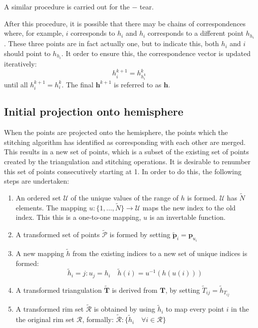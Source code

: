 \documentclass{article}
\renewcommand{\vec}[1]{\mathbf{#1}}
\begin{document}
A similar procedure is carried out for the $-$ tear.

After this procedure, it is possible that there may be chains of
correspondences where, for example, $i$ corresponds to $h_i$ and $h_i$
corresponds to a different point $h_{h_i}$. These three points are in
fact actually one, but to indicate this, both $h_i$ and $i$ should
point to $h_{h_i}$. It order to ensure this, the correspondence vector
is updated iteratively:
\begin{displaymath}
  h^{k+1}_i = h^k_{h^k_i}  
\end{displaymath}
until all $h^{k+1}_i = h^k_i$. The final $\vec{h}^{k+1}$ is referred
to as $\vec{h}$.



\subsection{Initial projection onto hemisphere}
\label{fold-sphere:sec:proj-onto-hemisph}

When the points are projected onto the hemisphere, the points which
the stitching algorithm has identified as corresponding with each
other are merged. This results in a new set of points, which is a
subset of the existing set of points created by the triangulation and
stitching operations. It is desirable to renumber this set of points
consecutively starting at 1. In order to do this, the following steps
are undertaken:
\begin{enumerate}
\item An ordered set $\mathcal{U}$ of the unique values of the range
  of $h$ is formed. $\mathcal{U}$ has $\tilde N$ elements. The mapping
  $u: \{1,\dots, \tilde N\} \rightarrow \mathcal{U}$ maps the new
  index to the old index. This this is a one-to-one mapping, $u$ is an
  invertable function.
\item A transformed set of points $\mathcal{\tilde P}$ is formed by
  setting $\tilde{\vec{p}}_i = \vec{p}_{u_i}$
\item A new mapping $\tilde h$ from the existing indices to a
  new set of unique indices is formed:
  \begin{displaymath}
    \tilde h_i = j:u_j = h_i \quad
    \tilde h(i) = u^{-1}(h(u(i)))
  \end{displaymath}
\item A transformed triangulation $\tilde{\mathbf{T}}$ is derived from
  $\mathbf{T}$, by setting $\tilde{T}_{ij} = \tilde h_{T_{ij}}$
\item A transformed rim set $\mathcal{\tilde R}$ is obtained by using
  $\tilde h_i$ to map every point $i$ in the the original rim set
  $\mathcal{R}$, formally: $\mathcal{\tilde R}: \{\tilde h_i
  \quad\forall i \in \mathcal{R}\} $
\end{enumerate}
\end{document}
